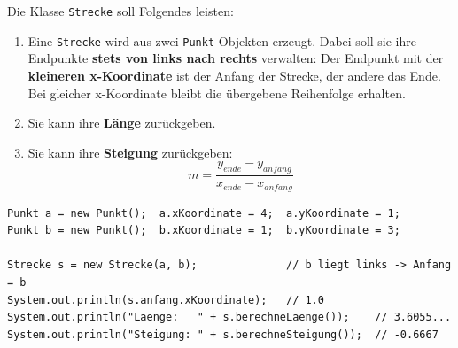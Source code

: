 \documentclass[
	fontsize=12pt,          %
	paper=a4,               %
	numbers=noenddot,       %
	listof=totoc,           %
	listof=entryprefix,     %
	listof=nochaptergap,    %
	bibliography=totoc,     %
	parskip=half            %
	openany                 %
]{scrbook}
\begin{document}
Die Klasse \texttt{Strecke} soll Folgendes leisten:

\begin{enumerate}[label=\textbf{\arabic*.)}]
	\item Eine \texttt{Strecke} wird aus zwei \texttt{Punkt}-Objekten erzeugt.
		Dabei soll sie ihre Endpunkte \textbf{stets von links nach rechts} verwalten: Der Endpunkt mit der \textbf{kleineren x-Koordinate} ist der Anfang der Strecke, der andere das Ende.
		Bei gleicher x-Koordinate bleibt die übergebene Reihenfolge erhalten.

	\item Sie kann ihre \textbf{Länge} zurückgeben.

	\item Sie kann ihre \textbf{Steigung} zurückgeben:
		\[
			m = \frac{y_{ende} - y_{anfang}}{x_{ende} - x_{anfang}}
		\]
\end{enumerate}

\begin{beispiel}
\begin{lstlisting}
Punkt a = new Punkt();  a.xKoordinate = 4;  a.yKoordinate = 1;
Punkt b = new Punkt();  b.xKoordinate = 1;  b.yKoordinate = 3;

Strecke s = new Strecke(a, b);              // b liegt links -> Anfang = b
System.out.println(s.anfang.xKoordinate);   // 1.0
System.out.println("Laenge:   " + s.berechneLaenge());    // 3.6055...
System.out.println("Steigung: " + s.berechneSteigung());  // -0.6667
\end{lstlisting}
\end{beispiel}
\end{document}
